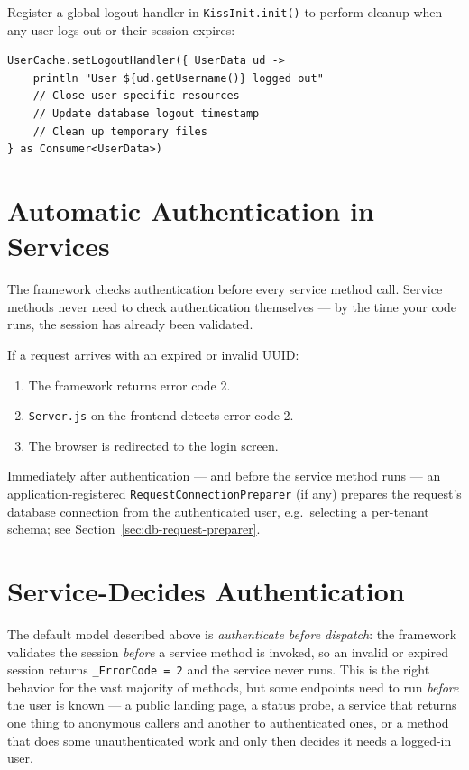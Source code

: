 Register a global logout handler in \texttt{KissInit.init()} to perform cleanup when any user logs out or their session expires:

\begin{lstlisting}[style=groovy]
UserCache.setLogoutHandler({ UserData ud ->
    println "User ${ud.getUsername()} logged out"
    // Close user-specific resources
    // Update database logout timestamp
    // Clean up temporary files
} as Consumer<UserData>)
\end{lstlisting}

\section{Automatic Authentication in Services}
\label{sec:auth-automatic}

The framework checks authentication before every service method call.  Service methods never need to check authentication themselves --- by the time your code runs, the session has already been validated.

If a request arrives with an expired or invalid UUID:
\begin{enumerate}
  \item The framework returns error code 2.
  \item \texttt{Server.js} on the frontend detects error code 2.
  \item The browser is redirected to the login screen.
\end{enumerate}

Immediately after authentication --- and before the service method runs --- an application-registered \texttt{RequestConnectionPreparer} (if any) prepares the request's database connection from the authenticated user, e.g.\ selecting a per-tenant schema; see Section~\ref{sec:db-request-preparer}.

\section{Service-Decides Authentication}
\label{sec:auth-service-decides}

The default model described above is \emph{authenticate before dispatch}: the framework validates the session \emph{before} a service method is invoked, so an invalid or expired session returns \texttt{\_ErrorCode = 2} and the service never runs.  This is the right behavior for the vast majority of methods, but some endpoints need to run \emph{before} the user is known --- a public landing page, a status probe, a service that returns one thing to anonymous callers and another to authenticated ones, or a method that does some unauthenticated work and only then decides it needs a logged-in user.

